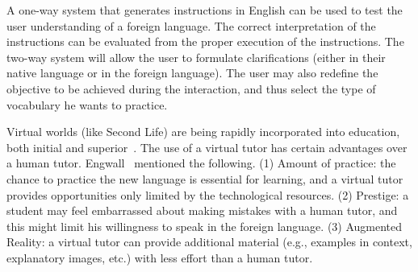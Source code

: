 A one-way system that generates instructions in English can be used to test the
user understanding of a foreign language. The correct interpretation of the
instructions can be evaluated from the proper execution of the instructions. The
two-way system will allow the user to formulate clarifications (either in their
native language or in the foreign language). The user may also redefine the
objective to be achieved during the interaction, and thus select the type of
vocabulary he wants to practice.

Virtual worlds (like Second Life) are being rapidly incorporated into
education, both initial and superior~\cite{Doswell05,molk:lear09}. The use of a
virtual tutor has certain advantages over a human tutor.
Engwall~ mentioned the following. (1) Amount of
practice: the chance to practice the new language is essential for learning, and
a virtual tutor provides opportunities only limited by the
technological resources. (2) Prestige: a student
may feel embarrassed about making mistakes with a human tutor, and this
might limit his willingness to speak in the foreign language. (3) Augmented
Reality: a virtual
tutor can provide additional material (e.g., examples in context, explanatory
images, etc.) with less effort than a human tutor.









